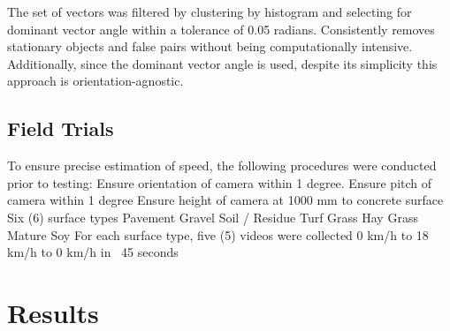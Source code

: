 The set of vectors was filtered by clustering by histogram and
selecting for dominant vector angle within a tolerance of 0.05
radians. Consistently removes stationary objects and false pairs
without being computationally intensive. Additionally, since the
dominant vector angle is used, despite its simplicity this approach is
orientation-agnostic.

\subsection{Field Trials}
To ensure precise estimation of speed, the following procedures were conducted prior to testing:
Ensure orientation of camera within 1 degree.
Ensure pitch of camera within 1 degree
Ensure height of camera at 1000 mm to concrete surface
Six (6) surface types
Pavement
Gravel
Soil / Residue
Turf Grass
Hay Grass
Mature Soy
For each surface type, five (5) videos were collected
0 km/h to 18 km/h to 0 km/h in ~45 seconds

\section{Results}

